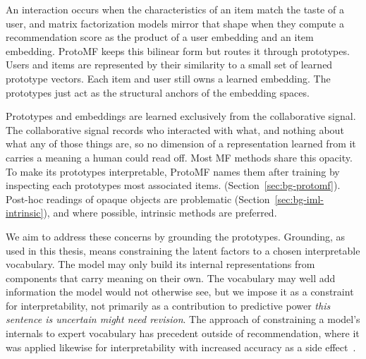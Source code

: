 
An interaction occurs when the characteristics of an item match the taste of a
user, and matrix factorization models mirror that shape when they compute a
recommendation score as the product of a user embedding and an item embedding.
ProtoMF keeps this bilinear form but routes it through prototypes. Users and
items are represented by their similarity to a small set of learned prototype
vectors. Each item and user still owns a learned embedding. The prototypes
just act as the structural anchors of the embedding spaces.

Prototypes and embeddings are learned exclusively from the collaborative
signal. The collaborative signal records who interacted with what, and nothing
about what any of those things are, so no dimension of a representation
learned from it carries a meaning a human could read off. Most MF methods
share this opacity. To make its prototypes interpretable, ProtoMF names them
after training by inspecting each prototypes most associated items.
(Section~\ref{sec:bg-protomf}).
Post-hoc readings of opaque objects are problematic
(Section~\ref{sec:bg-iml-intrinsic}), and where possible, intrinsic methods
are preferred.

We aim to address these concerns by grounding the prototypes. Grounding, as
used in this thesis, means constraining the latent factors to a chosen
interpretable vocabulary. The model may only build its internal
representations from components that carry meaning on their own. The
vocabulary may well add information the model would not otherwise see, but we
impose it as a constraint for interpretability, not primarily as a
contribution to predictive power \textit{this sentence is uncertain might need
revision}. The approach of constraining a model's internals to expert
vocabulary has precedent outside of recommendation, where it was applied
likewise for interpretability with increased accuracy as a side
effect~\cite{niknazar2024sleep}.

